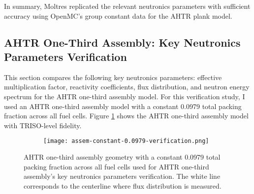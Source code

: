 In summary, Moltres replicated the relevant neutronics parameters with sufficient 
accuracy using OpenMC's group constant data for the \gls{AHTR} plank model. 

\subsection{AHTR One-Third Assembly: Key Neutronics Parameters Verification}
This section compares the following key neutronics parameters: effective multiplication 
factor, reactivity coefficients, flux distribution, and neutron energy spectrum for the 
\gls{AHTR} one-third assembly model. 
For this verification study, I used an \gls{AHTR} one-third assembly model with a 
constant 0.0979 total packing fraction across all fuel cells.  
Figure \ref{fig:ahtr-assem-verification} shows the \gls{AHTR} one-third assembly 
model with TRISO-level fidelity.
\begin{figure}[htbp]
    \centering
    \begin{subfigure}{.7\textwidth}
    \texttt{[image: assem-constant-0.0979-verification.png]}
    \end{subfigure}%
    \begin{subfigure}{.3\textwidth}
        \vspace{1cm}
    \end{subfigure}
    \caption{\acrfull{AHTR} one-third assembly geometry with a constant 0.0979 total packing 
    fraction across all fuel cells used for \gls{AHTR} one-third assembly's key neutronics 
    parameters verification. 
    The white line corresponds to the centerline where flux distribution is measured. }  
    \label{fig:ahtr-assem-verification}
\end{figure}

